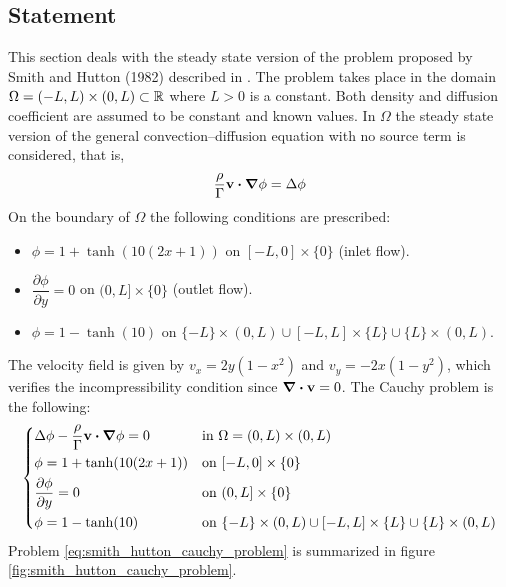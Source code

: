 
\subsection{Statement}

This section deals with the steady state version of the problem proposed by Smith and Hutton (1982) described in \cite{smith1982numerical}. The problem takes place in the domain $\Omega = (-L,L) \times (0,L) \subset \mathbb{R}$ where $L > 0$ is a constant. Both density and diffusion coefficient are assumed to be constant and known values. In $\Omega$ the steady state version of the general convection--diffusion equation with no source term is considered, that is,
\begin{equation}
	\frac{\rho}{\Gamma} \vb{v} \vdot \grad{\phi} = \Delta{\phi}
\end{equation}
On the boundary of $\Omega$ the following conditions are prescribed:
\begin{itemize}[topsep=0pt]
	\item $\phi = 1 + \tanh(10(2x+1))$ on $[-L,0] \times \{ 0 \}$ (inlet flow).
	\item $\dfrac{\partial \phi}{\partial y} = 0$ on $(0,L] \times \{ 0 \}$ (outlet flow).
	\item $\phi = 1 - \tanh(10)$ on $\{ -L \} \times (0,L) \cup [-L,L] \times \{ L \} \cup \{ L \} \times (0,L)$.
\end{itemize}
The velocity field is given by $v_x = 2 y (1 - x^2)$ and $v_y = -2 x (1 - y^2)$, which verifies the incompressibility condition since $\div{\vb{v}} = 0$. The Cauchy problem is the following:
\begin{equation} \label{eq:smith_hutton_cauchy_problem}
	\left\{
	\begin{aligned}
		&\Delta \phi - \frac{\rho}{\Gamma} \vb{v} \vdot \grad{\phi} = 0 &
		&\text{in } \Omega = (0,L) \times (0,L) \\
		&\phi = 1 + \tanh(10(2x+1)) & 
		&\text{on } [-L,0] \times \{ 0 \} \\
		&\frac{\partial \phi}{\partial y} = 0 & 
		&\text{on } (0,L] \times \{ 0 \} \\
		&\phi = 1 - \tanh(10) & 
		&\text{on } \{ -L \} \times (0,L) \cup [-L,L] \times \{ L \} \cup \{ L \} \times (0,L)
	\end{aligned}
	\right.
\end{equation}
Problem \eqref{eq:smith_hutton_cauchy_problem} is summarized in figure \ref{fig:smith_hutton_cauchy_problem}.

